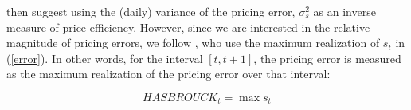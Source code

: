 \documentclass{article}
\begin{document}
\begin{itemize}
    \citet{harris1997order} then suggest using the (daily) variance of the pricing error, $\sigma_s^2$ as an inverse measure of price efficiency. However, since we are interested in the relative magnitude of pricing errors, we follow \citet{rosch2017dynamics}, who use the maximum realization of $s_t$ in (\ref{error}). In other words, for the interval $[t,t+1]$, the pricing error is measured as the maximum realization of the pricing error over that interval:

    \begin{equation*}
    HASBROUCK_t=\max{s_t}
    \end{equation*}

%

\end{itemize}
\end{document}
